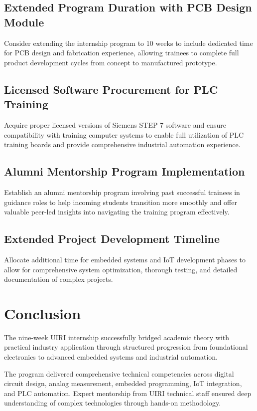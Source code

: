 \documentclass[12pt,a4paper]{report}
\begin{document}
\subsection{Extended Program Duration with PCB Design Module}
\noindent Consider extending the internship program to 10 weeks to include dedicated time for PCB design and fabrication experience, allowing trainees to complete full product development cycles from concept to manufactured prototype.

\subsection{Licensed Software Procurement for PLC Training}
\noindent Acquire proper licensed versions of Siemens STEP 7 software and ensure compatibility with training computer systems to enable full utilization of PLC training boards and provide comprehensive industrial automation experience.

\subsection{Alumni Mentorship Program Implementation}
\noindent Establish an alumni mentorship program involving past successful trainees in guidance roles to help incoming students transition more smoothly and offer valuable peer-led insights into navigating the training program effectively.

\subsection{Extended Project Development Timeline}
\noindent Allocate additional time for embedded systems and IoT development phases to allow for comprehensive system optimization, thorough testing, and detailed documentation of complex projects.

\section{Conclusion}

\noindent The nine-week UIRI internship successfully bridged academic theory with practical industry application through structured progression from foundational electronics to advanced embedded systems and industrial automation.

\noindent The program delivered comprehensive technical competencies across digital circuit design, analog measurement, embedded programming, IoT integration, and PLC automation. Expert mentorship from UIRI technical staff ensured deep understanding of complex technologies through hands-on methodology.
\end{document}
